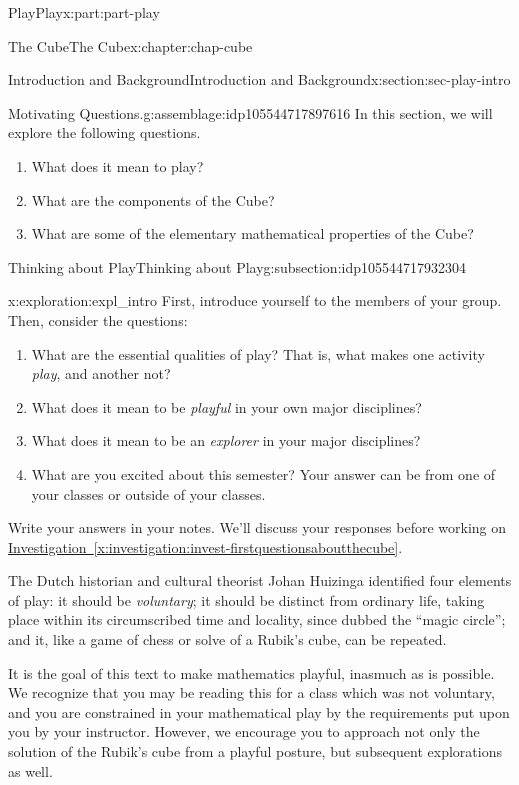 \documentclass[oneside,10pt,]{book}
\newcommand{\xreffont}{\relax}
\numberwithin{equation}{section}
\begin{document}
\begin{partptx}{Play}{}{Play}{}{}{x:part:part-play}
\begin{chapterptx}{The Cube}{}{The Cube}{}{}{x:chapter:chap-cube}
\begin{sectionptx}{Introduction and Background}{}{Introduction and Background}{}{}{x:section:sec-play-intro}
\begin{introduction}{}
\begin{assemblage}{Motivating Questions.}{g:assemblage:idp105544717897616}%
In this section, we will explore the following questions. %
\begin{enumerate}
\item{}What does it mean to play?%
\item{}What are the components of the Cube?%
\item{}What are some of the elementary mathematical properties of the Cube?%
\end{enumerate}
%
\end{assemblage}
\end{introduction}%
%
%
\typeout{************************************************}
\typeout{************************************************}
%
\begin{subsectionptx}{Thinking about Play}{}{Thinking about Play}{}{}{g:subsection:idp105544717932304}
\begin{exploration}{}{x:exploration:expl_intro}%
First, introduce yourself to the members of your group. Then, consider the questions: %
\begin{enumerate}
\item{}What are the essential qualities of play? That is, what makes one activity \emph{play}, and another not?%
\item{}What does it mean to be \emph{playful} in your own major disciplines?%
\item{}What does it mean to be an \emph{explorer} in your major disciplines?%
\item{}What are you excited about this semester? Your answer can be from one of your classes or outside of your classes.%
\end{enumerate}
 Write your answers in your notes. We'll discuss your responses before working on \hyperref[x:investigation:invest-firstquestionsaboutthecube]{Investigation~{\xreffont\ref{x:investigation:invest-firstquestionsaboutthecube}}}.%
\end{exploration}%
The Dutch historian and cultural theorist Johan Huizinga identified four elements of play: it should be \emph{voluntary}; it should be distinct from ordinary life, taking place within its circumscribed time and locality, since dubbed the ``magic circle''; and it, like a game of chess or solve of a Rubik's cube, can be repeated.%
\par
It is the goal of this text to make mathematics playful, inasmuch as is possible. We recognize that you may be reading this for a class which was not voluntary, and you are constrained in your mathematical play by the requirements put upon you by your instructor. However, we encourage you to approach not only the solution of the Rubik's cube from a playful posture, but subsequent explorations as well.%

\end{subsectionptx}
\end{sectionptx}
\end{chapterptx}
\end{partptx}
\end{document}

